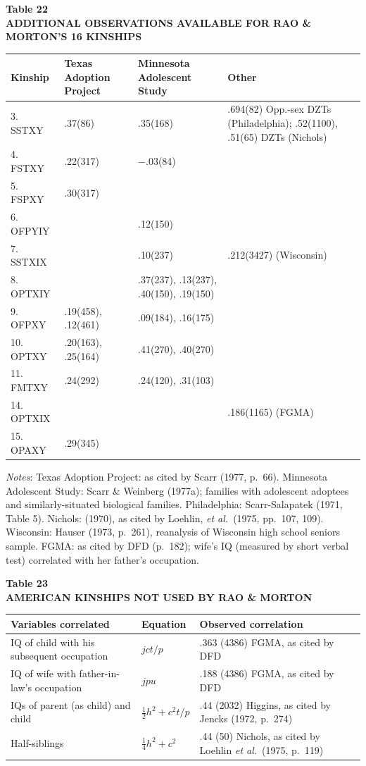﻿\documentclass[12pt]{article}
\begin{document}
\begin{center}
\textbf{Table 22}\\
\textbf{ADDITIONAL OBSERVATIONS AVAILABLE FOR RAO \& MORTON'S 16 KINSHIPS}
\end{center}
\begin{center}
\footnotesize
\begin{tabular}{l l l l}
\hline
Kinship & Texas Adoption Project & Minnesota Adolescent Study & Other \\
\hline
3. SSTXY & .37(86) & .35(168) & .694(82) Opp.-sex DZTs (Philadelphia); .52(1100), .51(65) DZTs (Nichols) \\
4. FSTXY & .22(317) & $-.03$(84) & \\
5. FSPXY & .30(317) & & \\
6. OFPYIY & & .12(150) & \\
7. SSTXIX & & .10(237) & .212(3427) (Wisconsin) \\
8. OPTXIY & & .37(237), .13(237), .40(150), .19(150) & \\
9. OFPXY & .19(458), .12(461) & .09(184), .16(175) & \\
10. OPTXY & .20(163), .25(164) & .41(270), .40(270) & \\
11. FMTXY & .24(292) & .24(120), .31(103) & \\
14. OPTXIX & & & .186(1165) (FGMA) \\
15. OPAXY & .29(345) & & \\
\hline
\end{tabular}
\end{center}
\emph{Notes}: Texas Adoption Project: as cited by Scarr (1977, p.\ 66). Minnesota Adolescent Study: Scarr \& Weinberg (1977a); families with adolescent adoptees and similarly-situated biological families. Philadelphia: Scarr-Salapatek (1971, Table 5). Nichols: (1970), as cited by Loehlin, \emph{et al.}\ (1975, pp.\ 107, 109). Wisconsin: Hauser (1973, p.\ 261), reanalysis of Wisconsin high school seniors sample. FGMA: as cited by DFD (p.\ 182); wife's IQ (measured by short verbal test) correlated with her father's occupation.

\begin{center}
\textbf{Table 23}\\
\textbf{AMERICAN KINSHIPS NOT USED BY RAO \& MORTON}
\end{center}
\begin{center}
\small
\begin{tabular}{p{5.5cm} l l}
\hline
Variables correlated & Equation & Observed correlation \\
\hline
IQ of child with his subsequent occupation & $jct/p$ & .363 (4386) FGMA, as cited by DFD \\
IQ of wife with father-in-law's occupation & $jpu$ & .188 (4386) FGMA, as cited by DFD \\
IQs of parent (as child) and child & $\tfrac12h^2+c^2t/p$ & .44 (2032) Higgins, as cited by Jencks (1972, p.\ 274) \\
Half-siblings & $\tfrac14h^2+c^2$ & .44 (50) Nichols, as cited by Loehlin \emph{et al.}\ (1975, p.\ 119) \\
\hline
\end{tabular}
\end{center}
\end{document}
